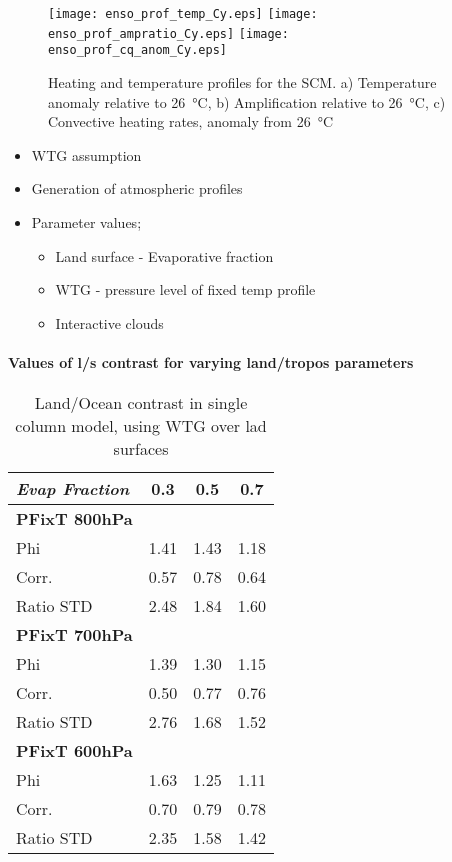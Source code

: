 \begin{figure}[ht]
\texttt{[image: enso\_prof\_temp\_Cy.eps]}
\texttt{[image: enso\_prof\_ampratio\_Cy.eps]}
\texttt{[image: enso\_prof\_cq\_anom\_Cy.eps]}
\caption{Heating and temperature profiles for the SCM. a) Temperature anomaly 
relative to \SI{26}{\degreeCelsius}, b) Amplification relative to 
\SI{26}{\degreeCelsius}, c) Convective heating rates, anomaly from 
\SI{26}{\degreeCelsius}}
\label{fig:scmsstprof}
\end{figure}

\begin{itemize}
	\item WTG assumption
	\item Generation of atmospheric profiles
	\item Parameter values;
		\begin{itemize}
			\item Land surface - Evaporative fraction
			\item WTG - pressure level of fixed temp profile
			\item Interactive clouds
		\end{itemize}
\end{itemize}
\paragraph{Values of l/s contrast for varying land/tropos parameters}

\begin{center}
	\begin{table}[ht]
		\caption{Land/Ocean contrast in single column model, using WTG over lad 
		surfaces}
		\label{tab:scmphi}
		\scriptsize
	\begin{tabular}{ l  c  c  c }
		\textit{Evap Fraction}		& 0.3   & 0.5  & 0.7 \\ \hline
		\textbf{PFixT 800hPa}\\%
	Phi  							& 1.41  & 1.43 & 1.18\\ %
	Corr.							& 0.57  & 0.78 & 0.64\\ %
	Ratio STD           			& 2.48  & 1.84 & 1.60\\ \hline
		\textbf{PFixT 700hPa}\\%
	Phi  							& 1.39  & 1.30 & 1.15\\ %
	Corr.							& 0.50  & 0.77 & 0.76\\ %
	Ratio STD           			& 2.76  & 1.68 & 1.52\\ \hline
		\textbf{PFixT 600hPa}\\%
	Phi  							& 1.63  & 1.25 & 1.11\\ %
	Corr.							& 0.70  & 0.79 & 0.78\\ %
	Ratio STD           			& 2.35  & 1.58 & 1.42\\ \hline
	\end{tabular}
	\end{table}
\end{center}
